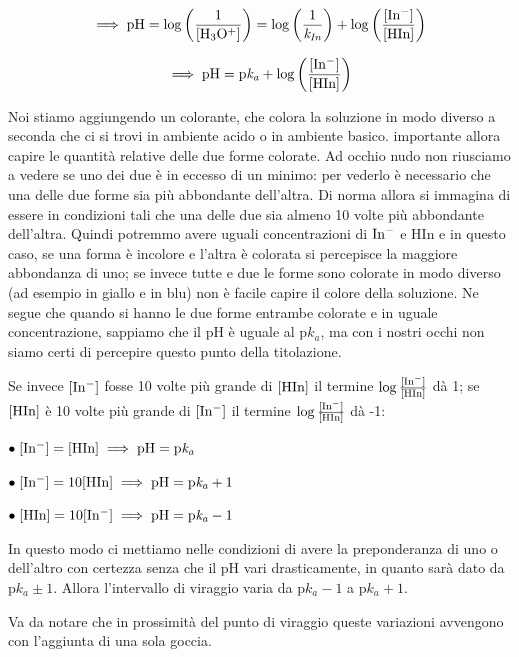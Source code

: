$$\implies \rm pH = log \left( \frac{1}{[H_3O^+]} \right) = log \left( \frac{1}{\textit{k}_{\textit{In}}} \right) + log \left( \frac{\rm{[In^-]}}{\rm{[HIn]}} \right)$$

$$\implies \rm pH= p\textit{k}_\textit{a} + log \left( \frac{\rm{[In^-]}}{\rm{[HIn]}} \right)$$

Noi stiamo aggiungendo un colorante, che colora la soluzione in modo diverso a seconda che ci si trovi in ambiente acido o in ambiente basico. \E importante allora capire le quantità relative delle due forme colorate. Ad occhio nudo non riusciamo a vedere se uno dei due è in eccesso di un minimo: per vederlo è necessario che una delle due forme sia più abbondante dell'altra. Di norma allora si immagina di essere in condizioni tali che una delle due sia almeno 10 volte più abbondante dell'altra. Quindi potremmo avere uguali concentrazioni di $\rm In^-$ e HIn e in questo caso, se una forma è incolore e l'altra è colorata si percepisce la maggiore abbondanza di uno; se invece tutte e due le forme sono colorate in modo diverso (ad esempio in giallo e in blu) non è facile capire il colore della soluzione. Ne segue che quando si hanno le due forme entrambe colorate e in uguale concentrazione, sappiamo che il pH è uguale al p$k_a$, ma con i nostri occhi non siamo certi di percepire questo punto della titolazione.

Se invece $\rm [In^-]$ fosse 10 volte più grande di $\rm [HIn]$ il termine $\rm \log{\frac{[In^-]}{[HIn]}}$ dà 1; se $\rm [HIn]$ è 10 volte più grande di $\rm [In^-]$ il termine $\rm \log{\frac{[In^-]}{[HIn]}}$ dà -1:

\vspace{0.2cm}$\bullet \rm \; [In^-]=[HIn] \implies pH=p\textit{k}_{\textit{a}}$

\vspace{0.2cm}$\bullet \rm \; [In^-]=10[HIn] \implies pH=p\textit{k}_{\textit{a}}+1$

\vspace{0.2cm}$\bullet \rm \; [HIn]=10[In^-] \implies pH=p\textit{k}_{\textit{a}}-1$

\vspace{0.2cm}In questo modo ci mettiamo nelle condizioni di avere la preponderanza di uno o dell'altro con certezza senza che il pH vari drasticamente, in quanto sarà dato da p$k_a \pm 1$. Allora l'intervallo di viraggio varia da p$k_a - 1$ a p$k_a + 1$.

Va da notare che in prossimità del punto di viraggio queste variazioni avvengono con l'aggiunta di una sola goccia.

